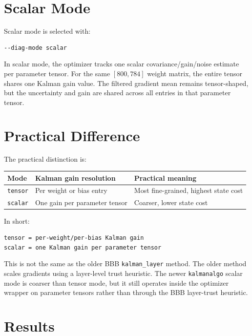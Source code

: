 \documentclass[11pt]{article}
\begin{document}
\section{Scalar Mode}

Scalar mode is selected with:
\begin{lstlisting}
--diag-mode scalar
\end{lstlisting}

In scalar mode, the optimizer tracks one scalar covariance/gain/noise estimate per parameter tensor. For the same $[800, 784]$ weight matrix, the entire tensor shares one Kalman gain value. The filtered gradient mean remains tensor-shaped, but the uncertainty and gain are shared across all entries in that parameter tensor.

\section{Practical Difference}

The practical distinction is:

\begin{center}
\begin{tabular}{lll}
\toprule
Mode & Kalman gain resolution & Practical meaning \\
\midrule
\texttt{tensor} & Per weight or bias entry & Most fine-grained, highest state cost \\
\texttt{scalar} & One gain per parameter tensor & Coarser, lower state cost \\
\bottomrule
\end{tabular}
\end{center}

In short:

\begin{lstlisting}
tensor = per-weight/per-bias Kalman gain
scalar = one Kalman gain per parameter tensor
\end{lstlisting}

This is not the same as the older BBB \texttt{kalman\_layer} method. The older method scales gradients using a layer-level trust heuristic. The newer \texttt{kalmanalgo} scalar mode is coarser than tensor mode, but it still operates inside the optimizer wrapper on parameter tensors rather than through the BBB layer-trust heuristic.

\section{Results}
\end{document}
